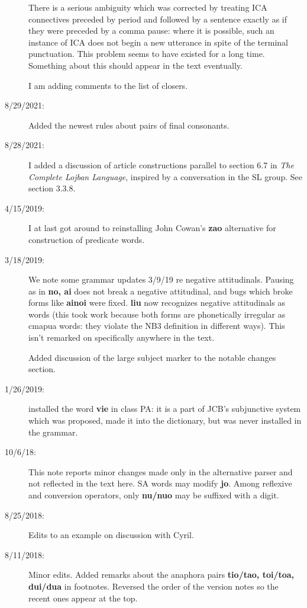 \documentclass[12pt]{book}
\begin{document}
\begin{description}
There is a serious ambiguity which was corrected by treating ICA connectives preceded by period and followed by a sentence exactly as if they were preceded by a comma pause:  where it is possible, such an instance of ICA does not begin a new utterance in spite of the terminal punctuation.  This problem seems to have existed for a long time.  Something about this should appear in the text eventually.

I am adding comments to the list of closers.

\item[8/29/2021:]  Added the newest rules about pairs of final consonants.

\item[8/28/2021:]  I added a discussion of article constructions parallel to section 6.7 in {\em The Complete Lojban Language}, inspired by a conversation in the SL group.  See section 3.3.8.

\item[4/15/2019:]  I at last got around to reinstalling John Cowan's {\bf zao} alternative for construction of predicate words.

\item[3/18/2019:]  We note some grammar updates 3/9/19 re negative attitudinals.  Pausing as in {\bf no, ai} does not break a negative attitudinal, and bugs which broke forms
like {\bf ainoi} were fixed.  {\bf liu} now recognizes negative attitudinals as words (this took work because both forms are phonetically irregular as cmapua words:  they violate the NB3 definition in different ways).  This isn't remarked on specifically anywhere in the text.

Added discussion of the large subject marker to the notable changes section.

\item[1/26/2019:]  installed the word {\bf vie} in class PA:  it is a part of JCB's subjunctive system which was proposed, made it into the dictionary, but was never installed in the grammar.

\item[10/6/18:]  This note reports minor changes made only in the alternative parser and not reflected in the text here.  SA words may modify {\bf jo}.  Among reflexive and conversion operators, only {\bf nu/nuo} may be suffixed with a digit.

\item[8/25/2018:]  Edits to an example on discussion with Cyril.

\item[8/11/2018:]  Minor edits.  Added remarks about the anaphora pairs {\bf tio/tao, toi/toa, dui/dua} in footnotes.  Reversed the order of the version notes so the recent ones appear at the top.


\end{description}
\end{document}
